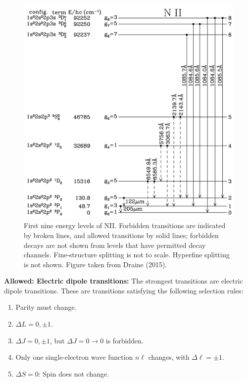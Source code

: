 \documentclass[a4paper,10pt]{article}
\begin{document}
\begin{figure}[t]
    \centering
    \includegraphics[width=14cm]{figures/NII_levels.png}
    \caption{\footnotesize{First nine energy levels of NII. Forbidden transitions are indicated by broken lines, and allowed transitions by solid lines; forbidden decays are not shown from levels that have permitted decay channels. Fine-structure splitting is not to scale. Hyperfine splitting is not shown. Figure taken from Draine (2015).}}
    \label{fig:NIIlevels}
\end{figure}

{\noindent}\textbf{Allowed: Electric dipole transitions:} The strongest transitions are electric dipole transitions. These are transitions satisfying the following selection rules:

\begin{enumerate}
    \item Parity must change.
    \item $\Delta L = 0, \pm1$.
    \item $\Delta J = 0, \pm1$, but $\Delta J = 0\rightarrow0$ is forbidden.
    \item Only one single-electron wave function $n\ell$ changes, with $\Delta\ell=\pm1$.
    \item $\Delta S=0$: Spin does not change.
\end{enumerate}
\end{document}
